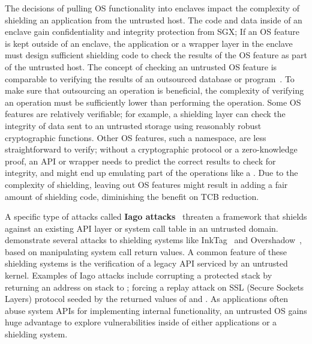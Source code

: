 The decisions of pulling OS functionality into enclaves
impact the complexity of shielding an application from the untrusted host.
The code and data inside of an enclave
gain confidentiality and integrity protection from SGX;
If an OS feature is kept outside of an enclave, the application or a wrapper layer in the enclave must design
sufficient shielding code to check the results of the OS feature
as part of the untrusted host.
The concept of checking an untrusted OS feature
is comparable to verifying the results of an outsourced database or program~\cite{bajaj13correctdb,zhang15integridb,ben2013snarks}.
To make sure that outsourcing an operation is beneficial,
the complexity of verifying an operation must be sufficiently lower than performing the operation.
Some OS features are relatively verifiable;
for example, a shielding layer can check the integrity of data sent to an untrusted storage using reasonably robust cryptographic functions.
Other OS features, such a namespace, are less straightforward to verify;
without a cryptographic protocol or a zero-knowledge proof,
an API or \linuxapi{} wrapper needs to predict the correct results to check for integrity, and might end up emulating part of the operations like a \libos{}.
Due to the complexity of shielding, leaving out OS features might result in adding a fair amount of shielding code, diminishing the benefit on TCB reduction.



A specific type of attacks called {\bf Iago attacks}~\cite{checkoway13iago}
threaten a framework that shields against an existing API layer or system call table in an untrusted domain.
\citeauthor{checkoway13iago}
demonstrate several attacks to shielding systems like InkTag~\cite{inktag} and Overshadow~\cite{overshadow}, based on manipulating system call return values.
A common feature of these shielding systems
is the verification of a legacy API serviced by an untrusted kernel.
Examples of Iago attacks include
corrupting a protected stack by returning an address on stack to ;
forcing a replay attack on SSL (Secure Sockets Layers) protocol
seeded by the returned values of  and .
As applications often abuse system APIs for implementing internal functionality,
an untrusted OS gains huge advantage to explore vulnerabilities inside of either applications or a shielding system.



